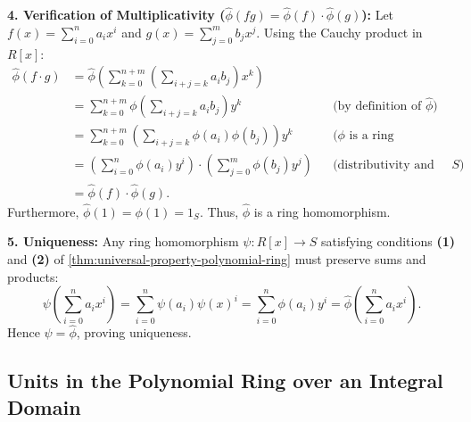 \begin{proofWrapper}
\begin{content}
\textbf{4. Verification of Multiplicativity ($\hat{\phi}(fg) = \hat{\phi}(f) \cdot \hat{\phi}(g)$):}
Let $f(x) = \sum_{i=0}^n a_i x^i$ and $g(x) = \sum_{j=0}^m b_j x^j$. Using the Cauchy product in $R[x]$:
\begin{align}
    \hat{\phi}(f \cdot g) &= \hat{\phi}\left( \sum_{k=0}^{n+m} \left( \sum_{i+j=k} a_i b_j \right) x^k \right) \nonumber \\
    &= \sum_{k=0}^{n+m} \phi\left( \sum_{i+j=k} a_i b_j \right) y^k && \text{(by definition of $\hat{\phi}$)} \nonumber \\
    &= \sum_{k=0}^{n+m} \left( \sum_{i+j=k} \phi(a_i) \phi(b_j) \right) y^k && \text{($\phi$ is a ring homomorphism)} \nonumber \\
    &= \left( \sum_{i=0}^n \phi(a_i) y^i \right) \cdot \left( \sum_{j=0}^m \phi(b_j) y^j \right) && \text{(distributivity and Cauchy product in $S$)} \nonumber \\
    &= \hat{\phi}(f) \cdot \hat{\phi}(g). \label{eq:multiplicativity-check}
\end{align}
Furthermore, $\hat{\phi}(1) = \phi(1) = 1_S$. Thus, $\hat{\phi}$ is a ring homomorphism.

\textbf{5. Uniqueness:}
Any ring homomorphism $\psi \colon R[x] \to S$ satisfying conditions \textbf{(1)} and \textbf{(2)} of \cref{thm:universal-property-polynomial-ring} must preserve sums and products:
\[
\psi\left( \sum_{i=0}^n a_i x^i \right) = \sum_{i=0}^n \psi(a_i) \psi(x)^i = \sum_{i=0}^n \phi(a_i) y^i = \hat{\phi}\left( \sum_{i=0}^n a_i x^i \right).
\]
Hence $\psi = \hat{\phi}$, proving uniqueness.
\end{content}

\end{proofWrapper}

\subsection{Units in the Polynomial Ring over an Integral Domain}

